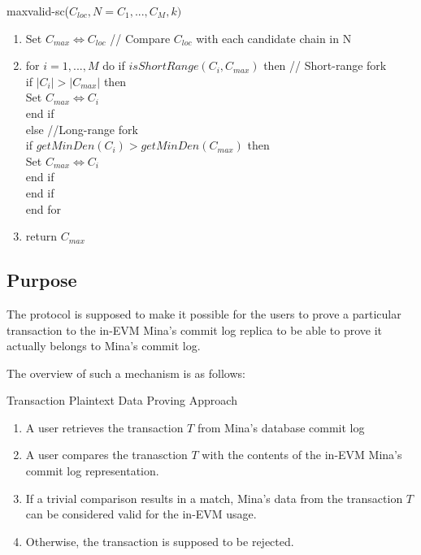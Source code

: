 \begin{algorithm}[H]
    \caption{maxvalid-sc($C_{loc}, N = {C_1, ... , C_M}, k)$}
    \begin{enumerate}
        \item Set $C_{max} \Leftrightarrow C_{loc}$ // Compare $C_{loc}$ with each candidate chain in N
        \item for $i = 1, ... , M$ do
            if $isShortRange(C_i, C_{max})$ then // Short-range fork\\
            if $|C_i| > |C_{max}|$ then \\
            Set $C_{max} \Leftrightarrow C_{i}$ \\
            end if\\
            else //Long-range fork\\
            if $getMinDen(C_i) > getMinDen(C_{max})$ then \\
            Set $C_{max} \Leftrightarrow C_{i}$ \\
            end if \\
            end if \\
            end for \\
        \item return $C_{max}$
    \end{enumerate}
\end{algorithm}

\subsection{Purpose}

The protocol is supposed to make it possible for the users to prove a particular
transaction to the in-EVM Mina's commit log replica to be able to prove it
actually belongs to Mina's commit log.

The overview of such a mechanism is as follows:

\begin{algorithm}[H]
    \caption{Transaction Plaintext Data Proving Approach}
    \label{commitlog}
    \begin{enumerate}
        \item A user retrieves the transaction $T$ from Mina's database commit log
        \item A user compares the tranasction $T$ with the contents of the
            in-EVM Mina's commit log representation.
        \item If a trivial comparison results in a match, Mina's data from the
            transaction $T$ can be considered valid for the in-EVM usage.
        \item Otherwise, the transaction is supposed to be rejected.
    \end{enumerate}
\end{algorithm}
